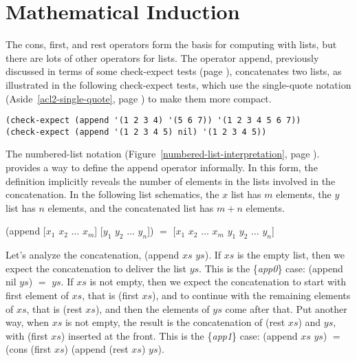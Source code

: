 \section{Mathematical Induction}
\label{sec:induction}
The \textsf{cons}, \textsf{first}, and \textsf{rest} operators
form the basis for computing with lists,
but there are lots of other operators for lists.
The operator \textsf{append}, previously discussed in terms of some \textsf{check-expect} tests
(page \pageref{append-op-informal}), concatenates two lists, as illustrated
in the following \textsf{check-expect} tests,
which use the single-quote notation (Aside~\ref{acl2-single-quote}, page \pageref{acl2-single-quote})
to make them more compact.

\begin{Verbatim}
(check-expect (append '(1 2 3 4) '(5 6 7)) '(1 2 3 4 5 6 7))
(check-expect (append '(1 2 3 4 5) nil) '(1 2 3 4 5))
\end{Verbatim}

The numbered-list notation
(Figure~\ref{numbered-list-interpretation}, page \pageref{numbered-list-interpretation}).
provides a way to define the \textsf{append} operator informally.
In this form, the definition implicitly reveals the number of elements in the lists
involved in the concatenation.
\label{list-schematic} In the following list schematics,
the $x$ list has $m$ elements, the $y$ list has $n$ elements,
and the concatenated list has $m+n$ elements.
\begin{samepage}
\begin{center}
\textsf{(append [$x_1$ $x_2$ $\dots$ $x_m$] [$y_1$ $y_2$ $\dots$ $y_n$])} $=$
\textsf{[$x_1$ $x_2$ $\dots$ $x_m$ $y_1$ $y_2$ $\dots$ $y_n$]}
\end{center}
\end{samepage}

Let's analyze the concatenation, \textsf{(append $xs$ $ys$)}.
If $xs$ is the empty list, then we expect
the concatenation to deliver the list $ys$.
This is the  \{\emph{app0}\} case: \textsf{(append nil $ys$)} $=$ $ys$.
If $xs$ is not empty, then we expect the concatenation
to start with first element of $xs$,
that is \textsf{(first $xs$)}, and to continue
with the remaining elements of $xs$, that is \textsf{(rest $xs$)},
and then the elements of $ys$ come after that.
Put another way, when $xs$ is not empty, 
the result is the concatenation of \textsf{(rest $xs$)} and $ys$,
with \textsf{(first $xs$)} inserted at the front.
This is the \{\emph{app1}\} case: \textsf{(append $xs$ $ys$)} $=$
\textsf{(cons (first $xs$) (append (rest $xs$) $ys$)}.

